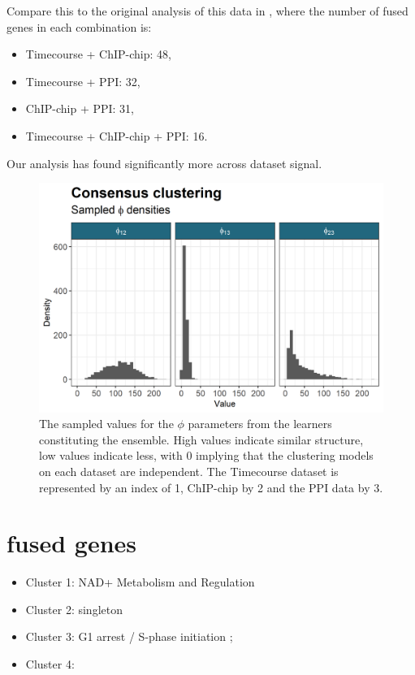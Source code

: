 \documentclass[]{article}
\begin{document}
Compare this to the original analysis of this data in \cite{kirk2012bayesian}, where the number of fused genes in each combination is:

\begin{itemize}
	\item Timecourse + ChIP-chip: 48,
	\item Timecourse + PPI: 32,
	\item ChIP-chip + PPI: 31,
	\item Timecourse + ChIP-chip + PPI: 16.
\end{itemize}
Our analysis has found significantly more across dataset signal.

\begin{figure}
	\centering
	\includegraphics[scale=0.8]{./Images/Yeast/Convergence/CCPhiDensityPlot.png}
	\caption{The sampled values for the $\phi$ parameters from the learners constituting the ensemble. High values indicate similar structure, low values indicate less, with 0 implying that the clustering models on each dataset are independent. The Timecourse dataset is represented by an index of 1, ChIP-chip by 2 and the PPI data by 3.}
	\label{fig:ccPhiDensities}
\end{figure}

\section{fused genes}

\begin{itemize}
	\item Cluster 1: NAD+ Metabolism and Regulation
	\item Cluster 2: singleton
	\item Cluster 3: G1 arrest / S-phase initiation \citep{schwob1993clb5, stuart1998clb5, crosby2007cell, chang2017yeast, miles2016msa1};
	\item Cluster 4: 
\end{itemize}
\end{document}
